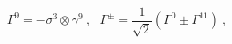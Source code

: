 \begin{equation}
 \Gamma^9= -\sigma^3 \otimes \gamma^9~,~~~
 \Gamma^{\pm} = \frac{1}{\sqrt{2}}(\Gamma^0 \pm \Gamma^{11})~,
\label{gamma}
\end{equation}

